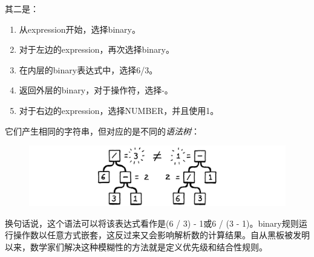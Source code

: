 \documentclass[cn,11pt,chinese]{elegantbook}
\newenvironment{code}[4][]
{\VerbatimEnvironment
  \begin{center}
  \begin{tcolorbox}[space to upper,
    skin=bicolor,
    colbacklower=black!75,
    collower=white,
    title={#4},
    halign=center,
    valign=center,
    nobeforeafter,
    halign lower=flush right,
    ]
    \begin{verbatim}}
    {\end{verbatim}\end{tcolorbox}\end{center}}
\begin{document}
其二是：

\begin{enumerate}
  \item 从expression开始，选择binary。
  \item 对于左边的expression，再次选择binary。
  \item 在内层的binary表达式中，选择6/3。
  \item 返回外层的binary，对于操作符，选择-。
  \item 对于右边的expression，选择NUMBER，并且使用1。
\end{enumerate}

它们产生相同的字符串，但对应的是不同的\textit{语法树}：

\begin{figure}[htbp]
  \centering
  \includegraphics[width=\textwidth]{image/parsing-expressions/syntax-trees.png}
\end{figure}

换句话说，这个语法可以将该表达式看作是(6 / 3) - 1或6 / (3 - 1)。binary规则运行操作数以任意方式嵌套，这反过来又会影响解析数的计算结果。自从黑板被发明以来，数学家们解决这种模糊性的方法就是定义优先级和结合性规则。

\end{document}
